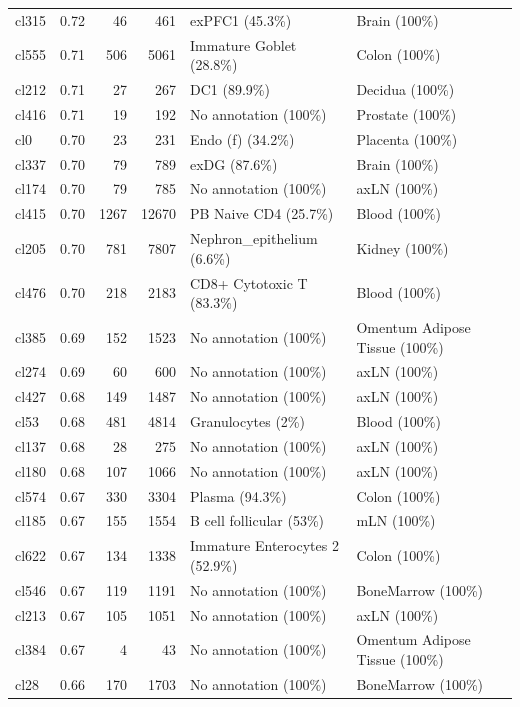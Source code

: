 \begin{table}[ht!]
\begin{tabular}{lrrrll}
  cl315 & 0.72 &  46 & 461 & exPFC1 (45.3\%) & Brain (100\%) \\ 
  cl555 & 0.71 & 506 & 5061 & Immature Goblet (28.8\%) & Colon (100\%) \\ 
  cl212 & 0.71 &  27 & 267 & DC1 (89.9\%) & Decidua (100\%) \\ 
  cl416 & 0.71 &  19 & 192 & No annotation (100\%) & Prostate (100\%) \\ 
  cl0 & 0.70 &  23 & 231 & Endo (f) (34.2\%) & Placenta (100\%) \\ 
  cl337 & 0.70 &  79 & 789 & exDG (87.6\%) & Brain (100\%) \\ 
  cl174 & 0.70 &  79 & 785 & No annotation (100\%) & axLN (100\%) \\ 
  cl415 & 0.70 & 1267 & 12670 & PB Naive CD4  (25.7\%) & Blood (100\%) \\ 
  cl205 & 0.70 & 781 & 7807 & Nephron\_epithelium (6.6\%) & Kidney (100\%) \\ 
  cl476 & 0.70 & 218 & 2183 & CD8+ Cytotoxic T (83.3\%) & Blood (100\%) \\ 
  cl385 & 0.69 & 152 & 1523 & No annotation (100\%) & Omentum Adipose Tissue (100\%) \\ 
  cl274 & 0.69 &  60 & 600 & No annotation (100\%) & axLN (100\%) \\ 
  cl427 & 0.68 & 149 & 1487 & No annotation (100\%) & axLN (100\%) \\ 
  cl53 & 0.68 & 481 & 4814 & Granulocytes (2\%) & Blood (100\%) \\ 
  cl137 & 0.68 &  28 & 275 & No annotation (100\%) & axLN (100\%) \\ 
  cl180 & 0.68 & 107 & 1066 & No annotation (100\%) & axLN (100\%) \\ 
  cl574 & 0.67 & 330 & 3304 & Plasma (94.3\%) & Colon (100\%) \\ 
  cl185 & 0.67 & 155 & 1554 & B cell follicular (53\%) & mLN (100\%) \\ 
  cl622 & 0.67 & 134 & 1338 & \specialcell[t]{Immature Enterocytes 2\\(52.9\%)} & Colon (100\%) \\ 
  cl546 & 0.67 & 119 & 1191 & No annotation (100\%) & BoneMarrow (100\%) \\ 
  cl213 & 0.67 & 105 & 1051 & No annotation (100\%) & axLN (100\%) \\ 
  cl384 & 0.67 &   4 &  43 & No annotation (100\%) & Omentum Adipose Tissue (100\%) \\ 
  cl28 & 0.66 & 170 & 1703 & No annotation (100\%) & BoneMarrow (100\%) \\ 

\end{tabular}
\end{table}
